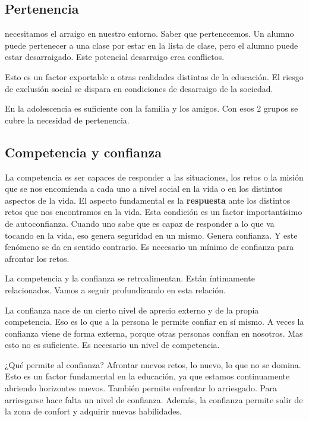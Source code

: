 \documentclass[palatino]{apuntesURJC}
\begin{document}
	\subsection{Pertenencia} necesitamos el arraigo en nuestro entorno. Saber que pertenecemos. 
%
Un alumno puede pertenecer a una clase por estar en la lista de clase, pero el alumno puede estar desarraigado. 
%
Este potencial desarraigo crea conflictos.

Esto es un factor exportable a otras realidades distintas de la educación. 
%
El riesgo de exclusión social se dispara en condiciones de desarraigo de la sociedad.

En la adolescencia es suficiente con la familia y los amigos. 
%
Con esos 2 grupos se cubre la necesidad de pertenencia.

	\subsection{Competencia y confianza} La competencia es ser capaces de responder a las situaciones, los retos o la misión que se nos encomienda a cada uno a nivel social en la vida o en los distintos aspectos de la vida. 
	El aspecto fundamental es la \textbf{respuesta} ante los distintos retos que nos encontramos en la vida.
	Esta condición es un factor importantísimo de autoconfianza. 
	Cuando uno sabe que es capaz de responder a lo que va tocando en la vida, eso genera seguridad en un mismo. Genera confianza.
	Y este fenómeno se da en sentido contrario.
	Es necesario un mínimo de confianza para afrontar los retos.


	La competencia y la confianza se retroalimentan. Están íntimamente relacionados.
	Vamos a seguir profundizando en esta relación.

	La confianza nace de un cierto nivel de aprecio externo y de la propia competencia. 
	Eso es lo que a la persona le permite confiar en sí mismo.
	A veces la confianza viene de forma externa, porque otras personas confían en nosotros. 
	Mas esto no es suficiente.
	Es necesario un nivel de competencia.

	¿Qué permite al confianza? Afrontar nuevos retos, lo nuevo, lo que no se domina. Esto es un factor fundamental en la educación, ya que estamos continuamente abriendo horizontes nuevos.
	También permite enfrentar lo arriesgado. Para arriesgarse hace falta un nivel de confianza.
	Además, la confianza permite salir de la zona de confort y adquirir nuevas habilidades.
\end{document}

